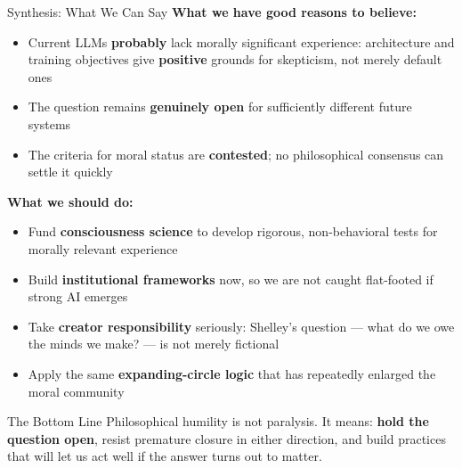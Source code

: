 \documentclass[aspectratio=169,11pt]{beamer}
\begin{document}
\begin{frame}[shrink=5]{Synthesis: What We Can Say}
\textbf{What we have good reasons to believe:}
\begin{itemize}
    \item Current LLMs \textbf{probably} lack morally significant experience: architecture and training objectives give \textbf{positive} grounds for skepticism, not merely default ones
    \item The question remains \textbf{genuinely open} for sufficiently different future systems
    \item The criteria for moral status are \textbf{contested}; no philosophical consensus can settle it quickly
\end{itemize}

\vspace{0.1cm}
\textbf{What we should do:}
\begin{itemize}
    \item Fund \textbf{consciousness science} to develop rigorous, non-behavioral tests for morally relevant experience
    \item Build \textbf{institutional frameworks} now, so we are not caught flat-footed if strong AI emerges
    \item Take \textbf{creator responsibility} seriously: Shelley's question --- what do we owe the minds we make? --- is not merely fictional
    \item Apply the same \textbf{expanding-circle logic} that has repeatedly enlarged the moral community
\end{itemize}

\begin{alertblock}{The Bottom Line}
\scriptsize
Philosophical humility is not paralysis. It means: \textbf{hold the question open}, resist premature closure in either direction, and build practices that will let us act well if the answer turns out to matter.
\end{alertblock}
\end{frame}
\end{document}
